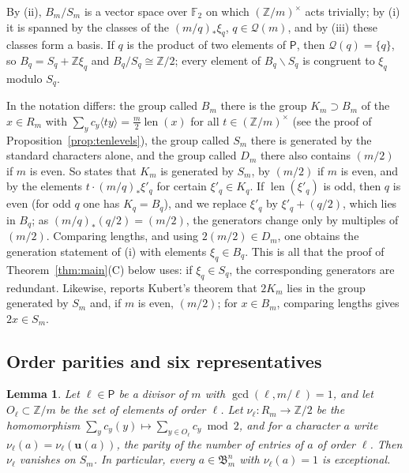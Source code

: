 \documentclass[11pt]{amsart}
\newtheorem{lemma}[theorem]{Lemma}
\theoremstyle{definition}
\theoremstyle{remark}
\numberwithin{equation}{section}
\newcommand{\Z}{\mathbb{Z}}
\newcommand{\F}{\mathbb{F}}
\newcommand{\fB}{\mathfrak{B}}
\newcommand{\cQ}{\mathcal{Q}}
\newcommand{\sP}{\mathsf{P}}
\newcommand{\uu}{\mathbf{u}}
\newcommand{\len}{\operatorname{len}}
\newcommand{\sm}{\smallsetminus}
\begin{document}
By (ii), $B_m/S_m$ is a vector space over $\F_2$ on which $(\Z/m)^\times$ acts trivially; by (i) it is spanned by the classes of the $(m/q)_*\xi_q$, $q\in\cQ(m)$, and by (iii) these classes form a basis. If $q$ is the product of two elements of $\sP$, then $\cQ(q)=\{q\}$, so $B_q=S_q+\Z\xi_q$ and $B_q/S_q\cong\Z/2$; every element of $B_q\sm S_q$ is congruent to $\xi_q$ modulo $S_q$.

In \cite{Ao83} the notation differs: the group called $B_m$ there is the group $K_m\supset B_m$ of the $x\in R_m$ with $\sum_yc_y\langle ty\rangle=\frac m2\len(x)$ for all $t\in(\Z/m)^\times$ (see the proof of Proposition~\ref{prop:tenlevels}), the group called $S_m$ there is generated by the standard characters alone, and the group called $D_m$ there also contains $(m/2)$ if $m$ is even. So \cite[Thm.~D]{Ao83} states that $K_m$ is generated by $S_m$, by $(m/2)$ if $m$ is even, and by the elements $t\cdot(m/q)_*\xi'_q$ for certain $\xi'_q\in K_q$. If $\len(\xi'_q)$ is odd, then $q$ is even (for odd $q$ one has $K_q=B_q$), and we replace $\xi'_q$ by $\xi'_q+(q/2)$, which lies in $B_q$; as $(m/q)_*(q/2)=(m/2)$, the generators change only by multiples of $(m/2)$. Comparing lengths, and using $2(m/2)\in D_m$, one obtains the generation statement of (i) with elements $\xi_q\in B_q$. This is all that the proof of Theorem~\ref{thm:main}(C) below uses: if $\xi_q\in S_q$, the corresponding generators are redundant. Likewise, \cite[Rem.~5.4]{Ao83} reports Kubert's theorem \cite{Ku79} that $2K_m$ lies in the group generated by $S_m$ and, if $m$ is even, $(m/2)$; for $x\in B_m$, comparing lengths gives $2x\in S_m$.

\subsection{Order parities and six representatives}\label{subsec:reps}

\begin{lemma}\label{lem:nu}
Let $\ell\in\sP$ be a divisor of $m$ with $\gcd(\ell,m/\ell)=1$, and let $O_\ell\subset\Z/m$ be the set of elements of order $\ell$. Let $\nu_\ell\colon R_m\to\Z/2$ be the homomorphism $\sum_yc_y(y)\mapsto\sum_{y\in O_\ell}c_y\bmod 2$, and for a character $a$ write $\nu_\ell(a)=\nu_\ell(\uu(a))$, the parity of the number of entries of $a$ of order $\ell$. Then $\nu_\ell$ vanishes on $S_m$. In particular, every $a\in\fB^n_m$ with $\nu_\ell(a)=1$ is exceptional.
\end{lemma}
\end{document}

